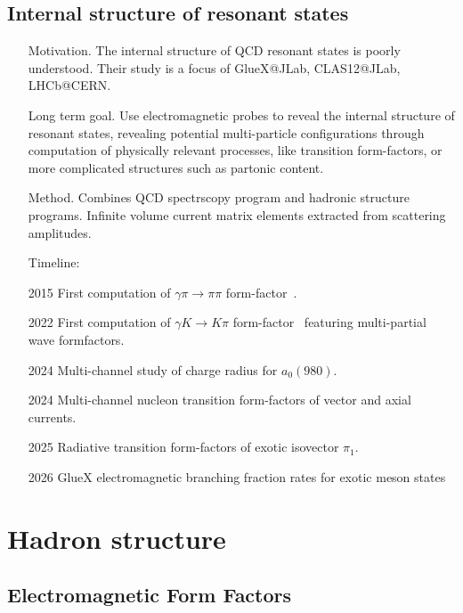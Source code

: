 \documentclass[prd,showpacs,showkeys,preprintnumbers,floatfix,
nofootinbib%
]{revtex4-2}
\begin{document}
\subsection{Internal structure of resonant states}
\begin{itemize}
    \item[Motivation.] The internal structure of QCD resonant states
      is poorly understood. Their study is a focus of GlueX@JLab, CLAS12@JLab, LHCb@CERN.
    \item[Long term goal.] Use electromagnetic probes to reveal the internal structure of resonant
      states, revealing potential multi-particle
      configurations through computation of physically relevant
      processes, like transition form-factors, or more complicated
      structures such as partonic content.
    \item[Method.] Combines QCD spectrscopy program and hadronic
      structure programs. Infinite volume current matrix elements
      extracted from scattering amplitudes.
\item[Timeline:]
    \item[2015] First computation of $\gamma\pi\rightarrow\pi\pi$ form-factor~\cite{Briceno:2015dca}. 
    \item[2022] First computation of $\gamma K\rightarrow K\pi$
      form-factor~\cite{Radhakrishnan:2022ubg} featuring multi-partial
      wave formfactors.
    \item[2024] Multi-channel study of charge radius for $a_0(980)$.
    \item[2024] Multi-channel nucleon transition form-factors of
      vector and axial currents.
    \item[2025] Radiative transition form-factors of exotic isovector
      $\pi_1$.
    \item[2026] GlueX electromagnetic branching fraction rates for
      exotic meson states
\end{itemize}




\section{Hadron structure}\label{sec:hadstruct}

\subsection{Electromagnetic Form Factors}\label{sec:vecff}
\end{document}
